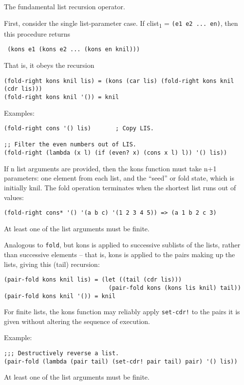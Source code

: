 \begin{entry}{%
  }

  The  fundamental list recursion operator.

  First, consider the single list-parameter case. If
  clist\textsubscript{1} = \texttt{(e1\ e2\ ...\ en)}, then this
  procedure returns

  \texttt{\ (kons\ e1\ (kons\ e2\ ...\ (kons\ en\ knil)))}

  That is, it obeys the recursion

\begin{verbatim}
(fold-right kons knil lis) = (kons (car lis) (fold-right kons knil (cdr lis)))
(fold-right kons knil '()) = knil
\end{verbatim}

  Examples:

\begin{verbatim}
(fold-right cons '() lis)       ; Copy LIS.

;; Filter the even numbers out of LIS.
(fold-right (lambda (x l) (if (even? x) (cons x l) l)) '() lis))
\end{verbatim}

  If n list arguments are provided, then the kons function must take
  n+1 parameters: one element from each list, and the ``seed'' or fold
  state, which is initially knil. The fold operation terminates when
  the shortest list runs out of values:

\begin{verbatim}
(fold-right cons* '() '(a b c) '(1 2 3 4 5)) => (a 1 b 2 c 3)
\end{verbatim}

  At least one of the list arguments must be finite.
\end{entry}

\begin{entry}{%
  }

  Analogous to
  \texttt{fold}, but kons is applied to successive sublists of the
  lists, rather than successive elements -- that is, kons is applied
  to the pairs making up the lists, giving this (tail) recursion:

\begin{verbatim}
(pair-fold kons knil lis) = (let ((tail (cdr lis)))
                              (pair-fold kons (kons lis knil) tail))
(pair-fold kons knil '()) = knil
\end{verbatim}

  For finite lists, the kons function may reliably apply
  \texttt{set-cdr!}  to the pairs it is given without altering the
  sequence of execution.

  Example:

\begin{verbatim}
;;; Destructively reverse a list.
(pair-fold (lambda (pair tail) (set-cdr! pair tail) pair) '() lis))
\end{verbatim}

  At least one of the list arguments must be finite.
\end{entry}

